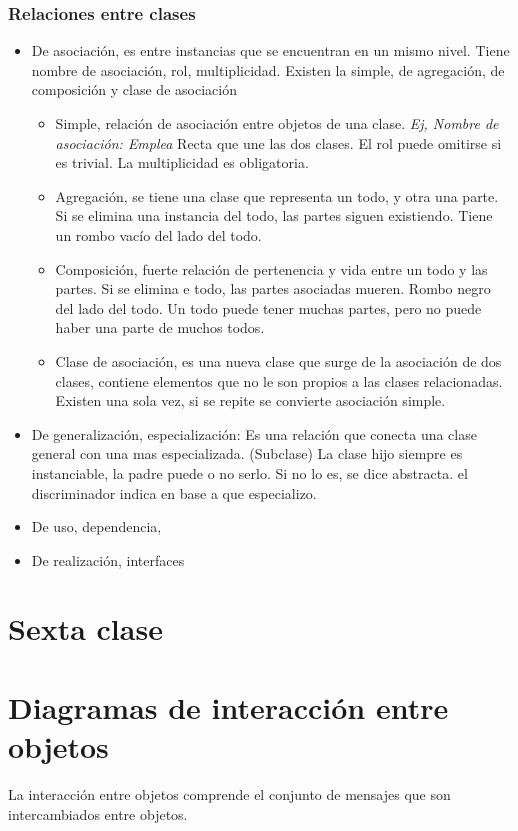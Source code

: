\documentclass[titlepage,a4paper]{article}
\begin{document}
\subsubsection*{Relaciones entre clases}
\begin{itemize}
    \item De asociación, es entre instancias que se encuentran en un mismo nivel. Tiene nombre de asociación, rol, multiplicidad. Existen la simple, de agregación, de composición y clase de asociación
    
    \begin{itemize}
        \item Simple, relación de asociación entre objetos de una clase. \textit{Ej, Nombre de asociación: Emplea} Recta que une las dos clases. El rol puede omitirse si es trivial. La multiplicidad es obligatoria.
        \item Agregación, se tiene una clase que representa un todo, y otra una parte. Si se elimina una instancia del todo, las partes siguen existiendo. Tiene un rombo vacío del lado del todo.
        \item Composición, fuerte relación de pertenencia y vida entre un todo y las partes. Si se elimina e todo, las partes asociadas mueren. Rombo negro del lado del todo. Un todo puede tener muchas partes, pero no puede haber una parte de muchos todos.
        \item Clase de asociación, es una nueva clase que surge de la asociación de dos clases, contiene elementos que no le son propios a las clases relacionadas. Existen una sola vez, si se repite se convierte asociación simple.
    \end{itemize}
    
    \item De generalización, especialización: Es una relación que conecta una clase general con una mas especializada. (Subclase) La clase hijo siempre es instanciable, la padre puede o no serlo. Si no lo es, se dice abstracta. el discriminador indica en base a que especializo.
    
    \item De uso, dependencia,
    \item De realización, interfaces
\end{itemize}


\section*{Sexta clase}
\section{Diagramas de interacción entre objetos}
La interacción entre objetos comprende el conjunto de mensajes que son intercambiados entre objetos.
\end{document}
